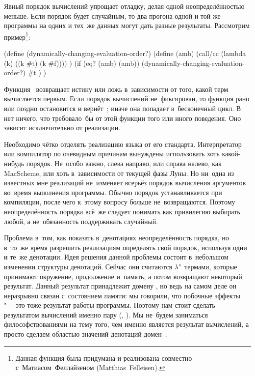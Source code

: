 Явный порядок вычислений упрощает отладку, делая одной неопределённостью меньше.
Если порядок будет случайным, то два прогона одной и той же программы на одних и
тех~же данных могут дать разные результаты. Рассмотрим пример\footnote{Данная
функция была придумана и реализована совместно с~Матиасом~Феллайзеном
(Matthias~Felleisen).}:

\begin{code:lisp}
(define (dynamically-changing-evaluation-order?)
  (define (amb)
    (call/cc (lambda (k) ((k #t) (k #f)))) )
  (if (eq? (amb) (amb))
    (dynamically-changing-evaluation-order?)
    #t ) )
\end{code:lisp}

Функция~ возвращает истину или ложь в~зависимости от того, какой терм
вычисляется первым. Если порядок вычислений не~фиксирован, то функция
 рано или поздно остановится и
вернёт~; иначе она попадает в~бесконечный цикл. В~{\RnRS} нет ничего,
что требовало~бы от этой функции того или иного поведения. Оно зависит
исключительно от реализации.

Необходимо чётко отделять реализацию языка от его стандарта. Интерпретатор или
компилятор по очевидным причинам вынуждены использовать хоть какой-нибудь
порядок. Не~особо важно, слева направо, или справа налево, как MacScheme, или
хоть в~зависимости от текущей фазы Луны. Но ни~одна из известных мне реализаций
не~изменяет всерьёз порядок вычисления аргументов во~время выполнения программы.
Обычно порядок устанавливается при компиляции, после чего к~этому вопросу больше
не~возвращаются. Поэтому неопределённость порядка всё~же следует понимать как
привилегию выбирать любой, а не~обязанность поддерживать случайный.

Проблема в~том, как показать в~денотациях неопределённость порядка, но в~то~же
время разрешить реализациям определять свой порядок, используя одни и те~же
денотации. Идея решения данной проблемы состоит в~небольшом изменении структуры
денотаций. Сейчас они считаются $\lambda$"~термами, которые принимают окружение,
продолжение и~память, а потом возвращают некоторый результат. Данный результат
принадлежит домену , но ведь на самом деле он неразрывно связан
с~состоянием памяти: мы говорили, что побочные эффекты "--- это тоже результат
работы программы. Поэтому нам стоит сделать результатом вычислений именно пару
(, ). Мы не~будем заниматься философствованиями на тему
того, чем именно является результат вычислений, а просто сделаем областью
значений денотаций домен~.

